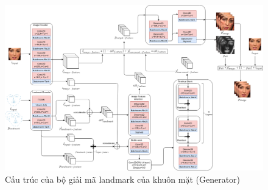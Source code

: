 \begin{figure}[H]
    \centering
    \includegraphics[width=15cm]{./content/materials/generator.png}
    \caption{Cấu trúc của bộ giải mã landmark của khuôn mặt (Generator)}
\end{figure}

